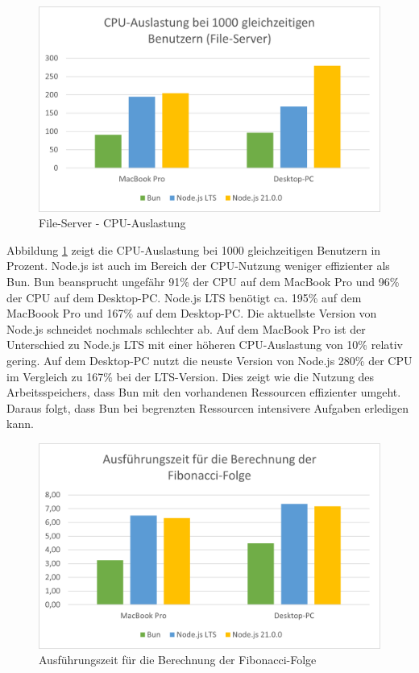\begin{figure}[h]
	\centering
	\includegraphics[width=\linewidth]{./images/fileServerCpuUsage.png}
	\caption{File-Server - CPU-Auslastung }
	\label{fig:fileServerCpuUsage}
\end{figure}

\noindent
Abbildung \ref{fig:fileServerCpuUsage} zeigt die CPU-Auslastung bei 1000 gleichzeitigen Benutzern in Prozent.  Node.js ist auch im Bereich der CPU-Nutzung weniger effizienter als Bun. Bun beansprucht ungefähr 91\% der CPU auf dem MacBook Pro und 96\% der CPU auf dem Desktop-PC. Node.js LTS benötigt ca. 195\% auf dem MacBoook Pro und 167\% auf dem Desktop-PC. Die aktuellste Version von Node.js schneidet nochmals schlechter ab. Auf dem MacBook Pro ist der Unterschied zu Node.js LTS mit einer höheren CPU-Auslastung von 10\% relativ gering. Auf dem Desktop-PC nutzt die neuste Version von Node.js 280\% der CPU im Vergleich zu 167\% bei der LTS-Version. Dies zeigt wie die Nutzung des Arbeitsspeichers, dass Bun mit den vorhandenen Ressourcen effizienter umgeht. Daraus folgt, dass Bun bei begrenzten Ressourcen intensivere Aufgaben erledigen kann.\\

\begin{figure}[h]
	\centering
	\includegraphics[width=\linewidth]{./images/fibonacciRuntime.png}
	\caption{Ausführungszeit für die Berechnung der Fibonacci-Folge}
	\label{fig:fibonacciRuntime}
\end{figure}


